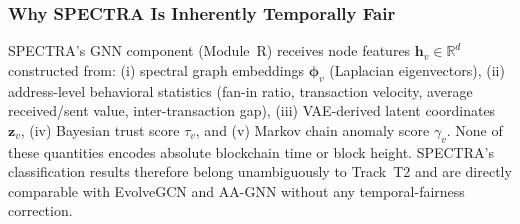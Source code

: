 \documentclass[journal]{IEEEtran}
\begin{document}
\subsubsection{Why SPECTRA Is Inherently Temporally Fair}
SPECTRA's GNN component (Module~R) receives node features
$\mathbf{h}_v \in \mathbb{R}^{d}$ constructed from:
(i) spectral graph embeddings $\boldsymbol{\phi}_v$ (Laplacian eigenvectors),
(ii) address-level behavioral statistics (fan-in ratio, transaction velocity,
average received/sent value, inter-transaction gap),
(iii) VAE-derived latent coordinates $\mathbf{z}_v$,
(iv) Bayesian trust score $\tau_v$, and
(v) Markov chain anomaly score $\gamma_v$.
None of these quantities encodes absolute blockchain time or block height.
SPECTRA's classification results therefore belong unambiguously to Track~T2
and are directly comparable with EvolveGCN and AA-GNN without any
temporal-fairness correction.

%
%
%
%


%
%
\end{document}
